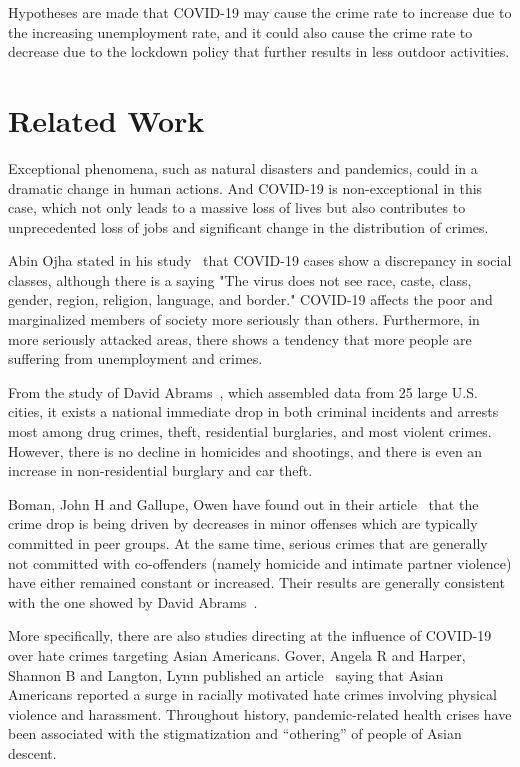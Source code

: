 \documentclass[conference]{IEEEtran}
\begin{document}
Hypotheses are made that COVID-19 may cause the crime rate to increase due to the increasing unemployment rate, and it could also cause the crime rate to decrease due to the lockdown policy that further results in less outdoor activities.

\section{Related Work}
Exceptional phenomena, such as natural disasters and pandemics, could in a dramatic change in human actions. And COVID-19 is non-exceptional in this case, which not only leads to a massive loss of lives but also contributes to unprecedented loss of jobs and significant change in the distribution of crimes.

Abin Ojha stated in his study~\cite{ojha2020pandemic} that COVID-19 cases show a discrepancy in social classes, although there is a saying "The virus does not see race, caste, class, gender, region, religion, language, and border." COVID-19 affects the poor and marginalized members of society more seriously than others. Furthermore, in more seriously attacked areas, there shows a tendency that more people are suffering from unemployment and crimes.

From the study of David Abrams~\cite{abrams2020covid}, which assembled data from 25 large U.S. cities, it exists a national immediate drop in both criminal incidents and arrests most among drug crimes, theft, residential burglaries, and most violent crimes. However,  there is no decline in homicides and shootings, and there is even an increase in non-residential burglary and car theft.

Boman, John H and Gallupe, Owen have found out in their article~\cite{boman2020has} that the crime drop is being driven by decreases in minor offenses which are typically committed in peer groups. At the same time, serious crimes that are generally not committed with co-offenders (namely homicide and intimate partner violence) have either remained constant or increased. Their results are generally consistent with the one showed by David Abrams~\cite{abrams2020covid}.

More specifically, there are also studies directing at the influence of COVID-19 over hate crimes targeting Asian Americans. Gover, Angela R and Harper, Shannon B and Langton, Lynn published an article~\cite{gover2020anti} saying that Asian Americans reported a surge in racially motivated hate crimes involving physical violence and harassment. Throughout history, pandemic-related health crises have been associated with the stigmatization and “othering” of people of Asian descent.
\end{document}
